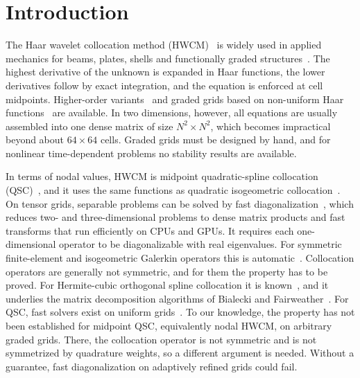 \documentclass[preprint,12pt]{elsarticle}
\theoremstyle{remark}
\begin{document}
\section{Introduction}
The Haar wavelet collocation method (HWCM)~\cite{chen1997haar,lepik2005numerical,lepik2011solving,lepik2014book}
is widely used in applied mechanics for beams, plates, shells and functionally graded
structures~\cite{majak2015accuracy,majak2015convergence,majak2018higher}. The highest derivative of the
unknown is expanded in Haar functions, the lower derivatives follow by exact integration, and the
equation is enforced at cell midpoints. Higher-order variants~\cite{majak2018higher,ratas2021solving} and
graded grids based on non-uniform Haar functions~\cite{dubeau2004nonuniform,lepik2008nonuniform,oruc2019nonuniform}
are available. In two dimensions, however, all equations are usually assembled into one dense matrix of
size $N^2\times N^2$, which becomes impractical beyond about $64\times64$ cells. Graded grids must be
designed by hand, and for nonlinear time-dependent problems no stability results are available.

In terms of nodal values, HWCM is midpoint quadratic-spline collocation
(QSC)~\cite{houstis1988quadratic,christara1994quadratic,christara2006optimal}, and it uses the same
functions as quadratic isogeometric collocation~\cite{auricchio2010isogeometric,schillinger2013isogeometric}.
On tensor grids, separable problems can be solved by fast diagonalization~\cite{lynch1964direct}, which
reduces two- and three-dimensional problems to dense matrix products and fast transforms that run
efficiently on CPUs and GPUs. It requires each one-dimensional operator to be diagonalizable with real
eigenvalues. For
symmetric finite-element and isogeometric Galerkin operators this is automatic~\cite{sangalli2016isogeometric}.
Collocation operators are generally not symmetric, and for them the property has to be proved. For
Hermite-cubic orthogonal spline collocation it is known~\cite{dyksen1987tensor,sun1999spectral}, and it
underlies the matrix decomposition algorithms of Bialecki and Fairweather~\cite{bialecki1995matrix,bialecki2011matrix}.
For QSC, fast solvers exist on uniform grids~\cite{christara2002fast}. To our knowledge, the property has
not been established for midpoint QSC, equivalently nodal HWCM, on arbitrary graded grids. There, the
collocation operator is not symmetric and is not symmetrized by quadrature weights, so a different
argument is needed. Without a guarantee, fast diagonalization on adaptively refined grids could fail.
\end{document}
